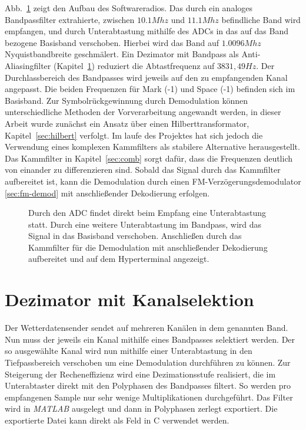 \documentclass{article}
\begin{document}
Abb.~\ref{fig:signal} zeigt den Aufbau des Softwareradios. Das durch ein analoges Bandpassfilter extrahierte, zwischen $10.1Mhz$ und $11.1Mhz$ befindliche Band wird empfangen, und durch Unterabtastung mithilfe des ADCs in das auf das Band bezogene Basisband verschoben.
Hierbei wird das Band auf $1.0096Mhz$ Nyquistbandbreite geschmälert. Ein Dezimator mit Bandpass als Anti-Aliasingfilter (Kapitel~\ref{sec:FIR}) reduziert die Abtastfrequenz auf $3831,49Hz$. Der Durchlassbereich des Bandpasses wird jeweils auf den zu empfangenden Kanal angepasst. Die beiden Frequenzen für Mark (-1) und Space (-1) befinden sich im Basisband. Zur Symbolrückgewinnung durch Demodulation können unterschiedliche Methoden der Vorverarbeitung angewandt werden, in dieser Arbeit wurde zunächst ein Ansatz über einen Hilberttransformator, Kapitel~\ref{sec:hilbert} verfolgt. Im laufe des Projektes hat sich jedoch die Verwendung eines komplexen Kammfilters
als stabilere Alternative herausgestellt. Das Kammfilter in Kapitel~\ref{sec:comb} sorgt dafür, dass die Frequenzen deutlich von einander zu differenzieren sind. Sobald das Signal durch das Kammfilter
aufbereitet ist, kann die Demodulation durch einen FM-Verzögerungsdemodulator \ref{sec:fm-demod} mit anschließender Dekodierung erfolgen.


\begin{figure}[!h]
    \centering
    \def\svgscale{0.5}
    \def\svgwidth{\columnwidth}
    \caption{Durch den ADC findet direkt beim Empfang eine Unterabtastung statt. Durch eine weitere Unterabtastung im Bandpass, wird das Signal in das Basisband verschoben.
    Anschließen durch das Kammfilter für die Demodulation mit anschließender Dekodierung aufbereitet und auf dem Hyperterminal angezeigt.}
    \label{fig:signal}
\end{figure}

\section{Dezimator mit Kanalselektion}\label{sec:FIR}
Der Wetterdatensender sendet auf mehreren Kanälen in dem genannten Band. Nun muss der jeweils ein Kanal mithilfe eines Bandpasses selektiert werden. Der so ausgewählte Kanal wird nun mithilfe einer Unterabtastung in den Tiefpassbereich verschoben um eine Demodulation durchführen zu können. Zur Steigerung der Recheneffizienz wird eine Dezimationsstufe realisiert, die im Unterabtaster direkt mit den Polyphasen des Bandpasses filtert. So werden pro empfangenen Sample nur sehr wenige Multiplikationen durchgeführt. Das Filter wird in \textit{MATLAB} ausgelegt und dann in Polyphasen zerlegt exportiert. Die exportierte Datei kann direkt als Feld in C verwendet werden.
\end{document}
